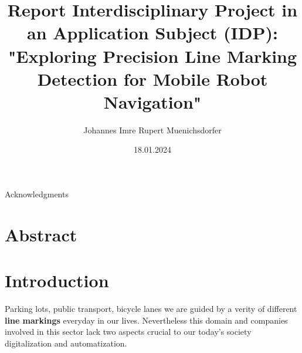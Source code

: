 

\renewcommand{\Topic}{IDP Report - Mark Robotics - Precision Line Marking Detection} %


\usepackage{todonotes} %



\title{Report Interdisciplinary Project in an Application Subject (IDP): "Exploring Precision Line Marking Detection for Mobile Robot Navigation"} %
\author{Johannes Imre Rupert Muenichsdorfer} %
\date{18.01.2024} %

\setcounter{page}{3} %

\begin{center}
{\fontsize{18pt}{27pt}\selectfont Acknowledgments}
\end{center}

\tableofcontents %

\chapter{Abstract}
\label{ch:abstract}

\chapter{Introduction}
\label{ch:introduction}

Parking lots, public transport, bicycle lanes \textemdash{} we are guided by a verity of different \textbf{line markings} everyday in our lives. Nevertheless this domain and companies involved in this sector lack two aspects crucial to our today's society \textemdash{} digitalization and automatization. 

